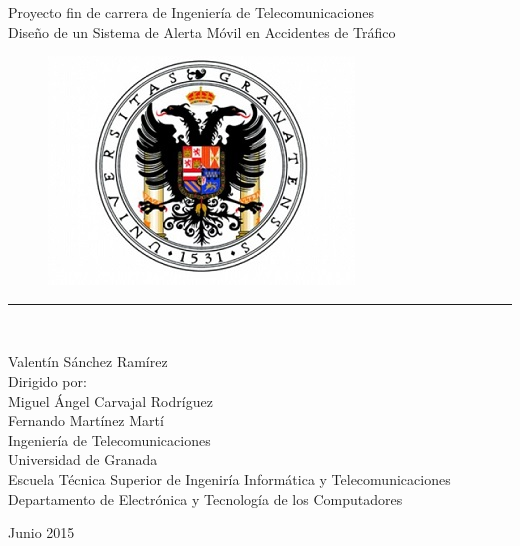 
		
		\begin{titlepage}
			
			\begin{center}
				
				\Large Proyecto fin de carrera de Ingeniería de Telecomunicaciones\\
				\vspace*{1cm}
				\Huge Diseño de un Sistema de Alerta Móvil en Accidentes de Tráfico
				\vspace*{0.3cm}
				\begin{figure}[h]
					\centering
					\includegraphics{imagenes/ugr.jpg}
				\end{figure}
				
			\end{center}
			
			
			\begin{center}
				\rule{12cm}{1pt}\\
				\vspace*{0.1in}
				
			
				\begin{large}
					\Large{Valentín Sánchez Ramírez} \\
					\vspace*{0.2in}
					\Large{Dirigido por:} \\
					\Large{Miguel \'Angel Carvajal Rodríguez} \\
					\Large{Fernando Martínez Martí} \\
					\vspace*{0.5in}
					\Large{Ingeniería de Telecomunicaciones} \\
					\vspace*{0.1in}
					\Large{Universidad de Granada} \\
					\Large{Escuela Técnica Superior de Ingeniría Informática y Telecomunicaciones}  \\
					\vspace*{0.1in}
					\Large{Departamento de Electrónica y Tecnología de los Computadores}
				\end{large}
				\vspace{1cm}
			\end{center}
			
			\begin{flushright}
				Junio 2015
			\end{flushright}
			
		\end{titlepage}